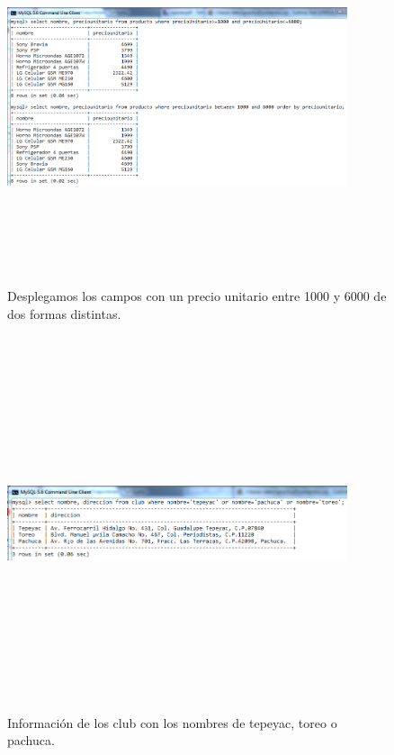 \documentclass[12pt, titlepage]{article}
\begin{document}
\begin{figure}[H]
    \begin{center}
        \includegraphics[width=10cm, height=11cm]{img/entre.png}
        \caption{Desplegamos los campos con un precio unitario entre 1000 y 6000 de dos formas distintas.}
        \label{fig:arlter3}
    \end{center}
\end{figure}
\begin{figure}[H]
    \begin{center}
        \includegraphics[width=10cm, height=11cm]{img/club.png}
        \caption{Información de los club con los nombres de tepeyac, toreo o pachuca.}
        \label{fig:arlter4}
    \end{center}
\end{figure}
\end{document}

